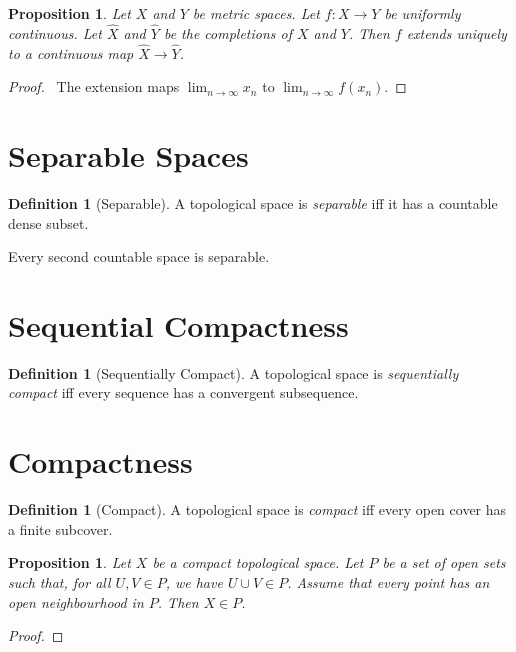 \documentclass{book}
\let\qed\relax
\newtheorem{prop}[ax]{Proposition}
\theoremstyle{definition}
\newtheorem{df}[ax]{Definition}
\begin{document}
\begin{prop}
Let $X$ and $Y$ be metric spaces. Let $f : X \rightarrow Y$ be uniformly continuous. Let $\hat{X}$ and $\hat{Y}$ be the completions of $X$ and $Y$. Then $f$ extends uniquely to a continuous map $\hat{X} \rightarrow \hat{Y}$.
\end{prop}

\begin{proof}
\pf\ The extension maps $\lim_{n \rightarrow \infty} x_n$ to $\lim_{n \rightarrow \infty} f(x_n)$. \qed
\end{proof}

\section{Separable Spaces}

\begin{df}[Separable]
A topological space is \emph{separable} iff it has a countable dense subset.
\end{df}

Every second countable space is separable.

\section{Sequential Compactness}

\begin{df}[Sequentially Compact]
A topological space is \emph{sequentially compact} iff every sequence has a convergent subsequence.
\end{df}

\section{Compactness}

\begin{df}[Compact]
A topological space is \emph{compact} iff every open cover has a finite subcover.
\end{df}

\begin{prop}
Let $X$ be a compact topological space. Let $P$ be a set of open sets such that, for all $U,V \in P$, we have $U \cup V \in P$. Assume that every point has an open neighbourhood in $P$. Then $X \in P$.
\end{prop}

\begin{proof}
\pf
{}
\qed
\end{proof}
\end{document}
